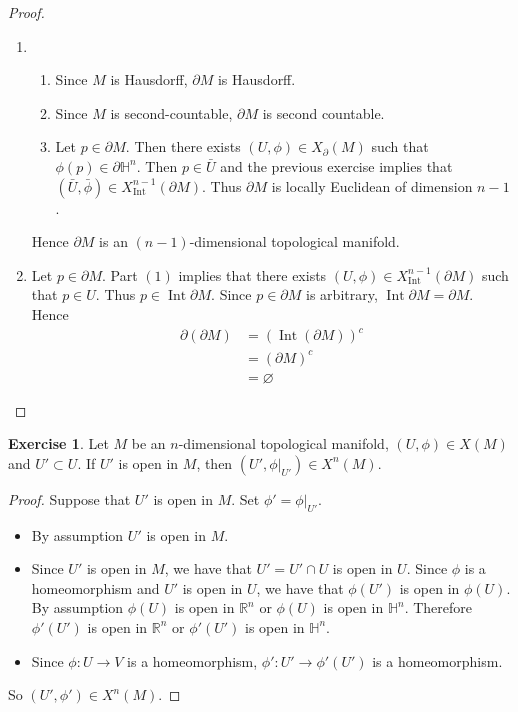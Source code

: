 \documentclass{book}
\theoremstyle{definition}
\newtheorem{ex}[definition]{Exercise}
\renewcommand{\H}{\mathbb{H}}
\newcommand{\R}{\mathbb{R}}
\DeclareMathOperator{\Int}{Int}
\DeclareMathOperator*{\0}{\mbf{0}}
\DeclareMathOperator*{\1}{\mbf{1}}
\newcommand{\p}{\partial}
\begin{document}
	\begin{proof}\
		\begin{enumerate}
			\item 
			\begin{enumerate}
				\item Since $M$ is Hausdorff, $\p M$ is Hausdorff.
				\item Since $M$ is second-countable, $\p M$ is second countable. 
				\item Let $p \in \p M$. Then there exists $(U, \phi) \in X_{\p}(M)$ such that $\phi(p) \in \p \H^n$. Then $p \in \bar{U}$ and the previous exercise implies that $(\bar{U}, \bar{\phi}) \in X^{n-1}_{\Int}(\p M)$. Thus $\p M$ is locally Euclidean of dimension $n-1$.
			\end{enumerate}
			Hence $\p M$ is an $(n-1)$-dimensional topological manifold.
			\item Let $p \in \p M$. Part $(1)$ implies that there exists $(U, \phi) \in X^{n-1}_{\Int}(\p M)$ such that $p \in U$. Thus $p \in \Int \p M$. Since $p \in \p M$ is arbitrary, $\Int \p M = \p M$. Hence 
			\begin{align*}
				\p (\p M)
				& = (\Int(\p M))^c \\
				& = (\p M)^c \\
				& = \varnothing
			\end{align*} 
		\end{enumerate}
	\end{proof}

	\begin{ex}
		Let $M$ be an $n$-dimensional topological manifold, $(U, \phi) \in X(M)$ and $U' \subset U$. If $U'$ is open in $M$, then $(U', \phi|_{U'}) \in X^n(M)$. 
	\end{ex}
	
	\begin{proof}
		Suppose that $U'$ is open in $M$. Set $\phi' = \phi|_{U'}$. 
		\begin{itemize}
			\item By assumption $U'$ is open in $M$.
			\item Since $U'$ is open in $M$, we have that $U' = U' \cap U$ is open in $U$. Since $\phi$ is a homeomorphism and $U'$ is open in $U$, we have that $\phi(U')$ is open in $\phi(U)$. By assumption $\phi(U)$ is open in $\R^n$ or $\phi(U)$ is open in $\H^n$. Therefore $\phi'(U')$ is open in $\R^n$ or $\phi'(U')$ is open in $\H^n$.
			\item Since $\phi:U \rightarrow V$ is a homeomorphism, $\phi': U' \rightarrow \phi'(U')$ is a homeomorphism. 
		\end{itemize}
		So $(U', \phi') \in X^n(M)$. 
	\end{proof}
	
\end{document}
